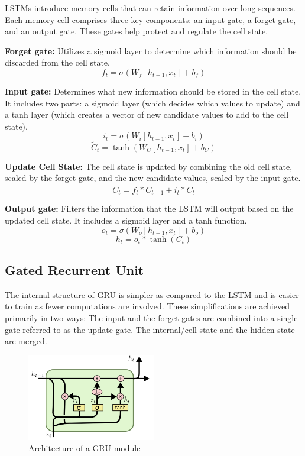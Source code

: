 \documentclass[conference]{IEEEtran}
\begin{document}
LSTMs introduce memory cells that can retain information over long sequences. Each memory cell comprises three key components: an input gate, a forget gate, and an output gate. These gates help protect and regulate the cell state.

\vspace{4}
\textbf{Forget gate:} Utilizes a sigmoid layer to determine which information should be discarded from the cell state.
\[
f_t = \sigma(W_f [h_{t-1}, x_t] + b_f)
\]

\textbf{Input gate:} Determines what new information should be stored in the cell state. It includes two parts: a sigmoid layer (which decides which values to update) and a tanh layer (which creates a vector of new candidate values to add to the cell state).
\[
i_t = \sigma(W_i [h_{t-1}, x_t] + b_i)
\]
\[
\tilde{C}_t = \tanh(W_C [h_{t-1}, x_t] + b_C)
\]

\textbf{Update Cell State:} The cell state is updated by combining the old cell state, scaled by the forget gate, and the new candidate values, scaled by the input gate.
\[
C_t = f_t * C_{t-1} + i_t * \tilde{C}_t
\]

\textbf{Output gate:} Filters the information that the LSTM will output based on the updated cell state. It includes a sigmoid layer and a tanh function.
\[
o_t = \sigma(W_o [h_{t-1}, x_t] + b_o)
\]
\[
h_t = o_t * \tanh(C_t)
\]

\subsection{Gated Recurrent Unit}
The internal structure of GRU is simpler as compared to the LSTM and is easier to train as fewer computations are involved. These simplifications are achieved primarily in two
ways: The input and the forget gates are combined into a single gate referred to as the update gate. The internal/cell state and the hidden state are merged.

\begin{figure}[htbp]
    \centering
    \includegraphics[width=0.5\textwidth]{Figure/GRU.png} %
    \caption{Architecture of a GRU module}
    \label{fig:example}
\end{figure}
\end{document}
